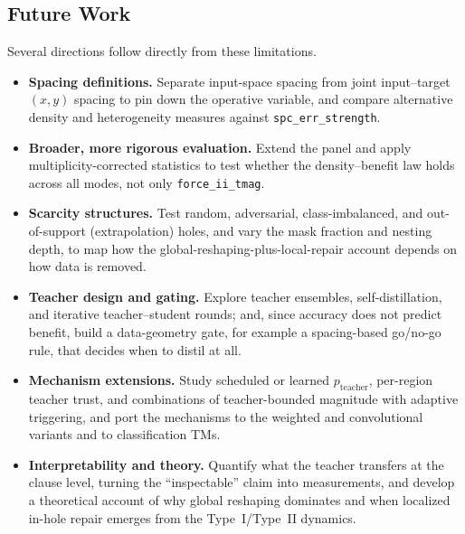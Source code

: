 \subsection{Future Work}

Several directions follow directly from these limitations.

\begin{itemize}
  \item \textbf{Spacing definitions.} Separate input-space spacing from joint
    input--target $(x,y)$ spacing to pin down the operative variable, and compare
    alternative density and heterogeneity measures against \texttt{spc\_err\_strength}.
  \item \textbf{Broader, more rigorous evaluation.} Extend the panel and apply
    multiplicity-corrected statistics to test whether the density--benefit law holds
    across all modes, not only \texttt{force\_ii\_tmag}.
  \item \textbf{Scarcity structures.} Test random, adversarial, class-imbalanced, and
    out-of-support (extrapolation) holes, and vary the mask fraction and nesting depth, to
    map how the global-reshaping-plus-local-repair account depends on how data is removed.
  \item \textbf{Teacher design and gating.} Explore teacher ensembles, self-distillation,
    and iterative teacher--student rounds; and, since accuracy does not predict benefit,
    build a data-geometry gate, for example a spacing-based go/no-go rule, that decides
    when to distil at all.
  \item \textbf{Mechanism extensions.} Study scheduled or learned $p_{\text{teacher}}$,
    per-region teacher trust, and combinations of teacher-bounded magnitude with adaptive
    triggering, and port the mechanisms to the weighted and convolutional variants and to
    classification TMs.
  \item \textbf{Interpretability and theory.} Quantify what the teacher transfers at the
    clause level, turning the ``inspectable'' claim into measurements, and develop a
    theoretical account of why global reshaping dominates and when localized in-hole repair
    emerges from the Type~I/Type~II dynamics.
\end{itemize}

